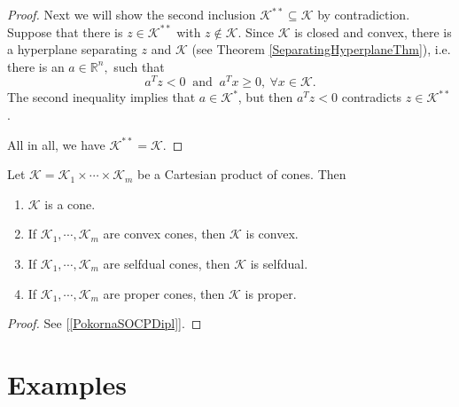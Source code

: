 \documentclass[12pt]{book}
\theoremstyle{definition}
\begin{document}
\begin{appendix}
\begin{proof}
Next we will show the second inclusion  $\mathcal{K}^{**} \subseteq \mathcal{K}$ by contradiction.
Suppose that there is $z \in \mathcal{K}^{**}$ with $z \notin \mathcal{K}$.
Since $\mathcal{K}$ is closed and convex, there is a hyperplane separating $z$ and $\mathcal{K}$ (see Theorem \ref{SeparatingHyperplaneThm}), i.e. there is an $a \in \mathbb{R}^n, $ such that 
$$ a^Tz <0  \ \mbox{ and } \ a^Tx\geq 0, \ \forall x\in\mathcal{K}.$$
The second inequality implies that $a\in \mathcal{K}^*$, but then  $ a^Tz <0 $ contradicts $z\in \mathcal{K}^{**}$.

All in all,  we have $\mathcal{K}^{**} = \mathcal{K}$.
\end{proof}




\prop[{[\ref{PokornaSOCPDipl}]}] 
\label{ConesCartesianProduct}
Let $\mathcal{K} = \mathcal{K}_1 \times \cdots \times \mathcal{K}_m $ be a Cartesian product of cones. Then
\begin{enumerate}
\item $\mathcal{K}$ is a cone.
\item If $\mathcal{K}_1, \cdots ,\mathcal{K}_m $ are convex cones, then $\mathcal{K}$ is convex.
\item If $\mathcal{K}_1, \cdots ,\mathcal{K}_m $ are selfdual cones, then $\mathcal{K}$ is selfdual.
\item If $\mathcal{K}_1, \cdots ,\mathcal{K}_m $ are proper cones, then $\mathcal{K}$ is proper.
\end{enumerate} 
\begin{proof}
See [\ref{PokornaSOCPDipl}].
\end{proof}






\section{Examples}



\end{appendix}
\end{document}
